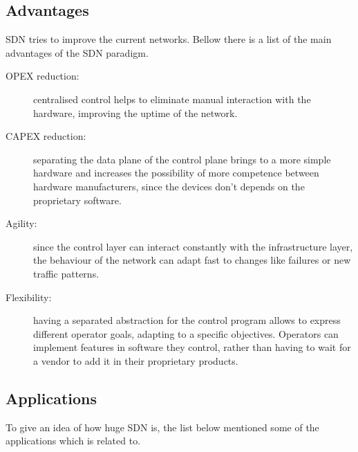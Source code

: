 \subsection{Advantages}

SDN tries to improve the current networks. Bellow there is a list of the main advantages of the SDN paradigm.\\

\begin{description}
\item[OPEX reduction:] centralised control helps to eliminate manual interaction with the hardware, improving the uptime of the network. 
\item[CAPEX reduction:] separating the data plane of the control plane brings to a more simple hardware and increases the possibility of more competence between hardware manufacturers, since the devices don't depends on the proprietary software.
\item[Agility:] since the control layer can interact constantly with the infrastructure layer, the behaviour of the network can adapt fast to changes like failures or new traffic patterns. 
\item[Flexibility:] having a separated abstraction for the control program allows to express different operator goals, adapting to a specific objectives. Operators can implement features in software they control, rather than having to wait for a vendor to add it in their proprietary products.\\
\end{description}



\subsection{Applications}

To give an idea of how huge SDN is, the list below mentioned some of the applications which is related to.\\

